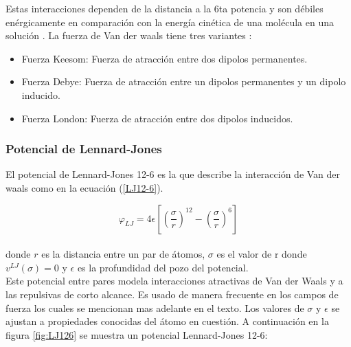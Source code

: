Estas interacciones dependen de la distancia a la 6ta potencia y son débiles enérgicamente en comparación con la energía cinética de una molécula en una solución \cite{201753}. La fuerza de Van der waals tiene tres variantes \cite{ROY20151}: 

\begin{itemize}
    \item Fuerza Keesom: Fuerza de atracción entre dos dipolos permanentes.
    \item Fuerza Debye: Fuerza de atracción entre un dipolos permanentes y un dipolo inducido.
    \item Fuerza London: Fuerza de atracción entre dos dipolos inducidos.
\end{itemize}

\subsubsection{Potencial de Lennard-Jones}

El potencial de Lennard-Jones 12-6 es la que describe la interacción de Van der waals como en la ecuación (\ref{LJ12-6}).

\begin{equation} \label{LJ12-6}
    \varphi_{LJ} = 4\epsilon \left[ \left(\frac{\sigma}{r} \right)^{12}-\left(\frac{\sigma}{r} \right)^{6}\right]
\end{equation}\\

donde $r$ es la distancia entre un par de átomos, $\sigma$ es el valor de r donde $v^{LJ}(\sigma)=0$ y $\epsilon$ es la profundidad del pozo del potencial.\\

Este potencial entre pares modela interacciones atractivas de Van der Waals y a las repulsivas de corto alcance. Es usado de manera frecuente en los campos de fuerza los cuales se mencionan mas adelante en el texto. Los valores de $\sigma$ y $\epsilon$ se ajustan a propiedades conocidas del átomo en cuestión. A continuación en la figura \ref{fig:LJ126} se muestra un potencial Lennard-Jones 12-6:\\


